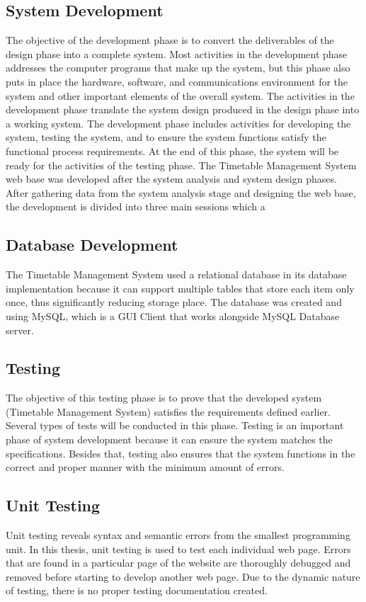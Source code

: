 \documentclass{scrreprt}
\begin{document}
\subsection{System Development }
The objective of the development phase is to convert the deliverables of the design
phase into a complete system. Most activities in the development phase addresses the
computer programs that make up the system, but this phase also puts in place the
hardware, software, and communications environment for the system and other
important elements of the overall system.
The activities in the development phase translate the system design produced in the
design phase into a working system. The development phase includes
activities for developing the system, testing the system, and to ensure the system
functions satisfy the functional process requirements. At the end of this phase, the
system will be ready for the activities of the testing phase. 
The Timetable Management System web base was developed after the system analysis
and system design phases. After gathering data from the system analysis stage and
designing the web base, the development is divided into three main sessions which a
\subsection{Database  Development}
The Timetable Management System used a relational database in its database
implementation because it can support multiple tables that store each item only once,
thus significantly reducing storage place. The database was created and using MySQL,
which is a GUI Client that works alongside MySQL Database server. 
\subsection{Testing}
The objective of this testing phase is to prove that the developed system (Timetable
Management System) satisfies the requirements defined earlier. Several types of tests
will be conducted in this phase. Testing is an important phase of system development
because it can ensure the system matches the specifications. Besides that, testing also
ensures that the system functions in the correct and proper manner with the minimum
amount of errors. 
\subsection {Unit Testing}
 Unit testing reveals syntax and semantic errors from the smallest programming unit. In
this thesis, unit testing is used to test each individual web page. Errors that are found in a
particular page of the website are thoroughly debugged and removed before starting to
develop another web page. Due to the dynamic nature of testing, there is no proper
testing documentation created. 
\end{document}
